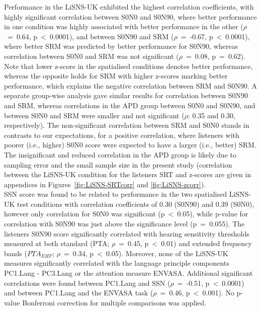 \documentclass[a4paper, twoside]{templates/ociamthesis}
\begin{document}
Performance in the LiSNS-UK exhibited the highest correlation coefficients, with highly significant correlation between S0N0 and S0N90, where better performance in one condition was highly associated with better performance in the other (\(\rho\)~=~0.64, p~\textless~0.0001), and between S0N90 and SRM (\(\rho\)~=~-0.67, p~\textless~0.0001), where better SRM was predicted by better performance for S0N90, whereas correlation between S0N0 and SRM was not significant (\(\rho\)~=~0.08, p~=~0.62). Note that lower z-score in the spatialised conditions denotes better performance, whereas the opposite holds for SRM with higher z-scores marking better performance, which explains the negative correlation between SRM and S0N90. A separate group-wise analysis gave similar results for correlation between S0N90 and SRM, whereas correlations in the APD group between S0N0 and S0N90, and between S0N0 and SRM were smaller and not significant (\(\rho\): 0.35 and 0.30, respectively). The non-significant correlation between SRM and S0N0 stands in contrasts to our expectations, for a positive correlation, where listeners with poorer (i.e., higher) S0N0 score were expected to have a larger (i.e., better) SRM. The insignificant and reduced correlation in the APD group is likely due to sampling error and the small sample size in the present study (correlation between the LiSNS-UK condition for the listeners SRT and z-scores are given in appendices in Figures~\ref{fig:LiSNS-SRTcorr} and \ref{fig:LiSNS-zcorr}).\\

SSN score was found to be related to performance in the two spatialised LiSNS-UK test conditions with correlation coefficients of 0.30 (S0N90) and 0.39 (S0N0), however only correlation for S0N0 was significant (p~\textless~0.05), while p-value for correlation with S0N90 was just above the significance level (p~=~0.055). The listeners S0N90 score significantly correlated with hearing sensitivity thresholds measured at both standard (PTA; \(\rho\)~=~0.45, p~\textless~0.01) and extended frequency bands (\(PTA_{EHF}\); \(\rho\)~=~0.34, p~\textless~0.05). Moreover, none of the LiSNS-UK measures significantly correlated with the language principle components PC1.Lang - PC3.Lang or the attention measure ENVASA. Additional significant correlations were found between PC1.Lang and SSN (\(\rho\)~=~-0.51, p~\textless~0.0001) and between PC1.Lang and the ENVASA task (\(\rho\)~=~0.46, p~\textless~0.001). No p-value Bonferroni correction for multiple comparisons was applied.
\end{document}
